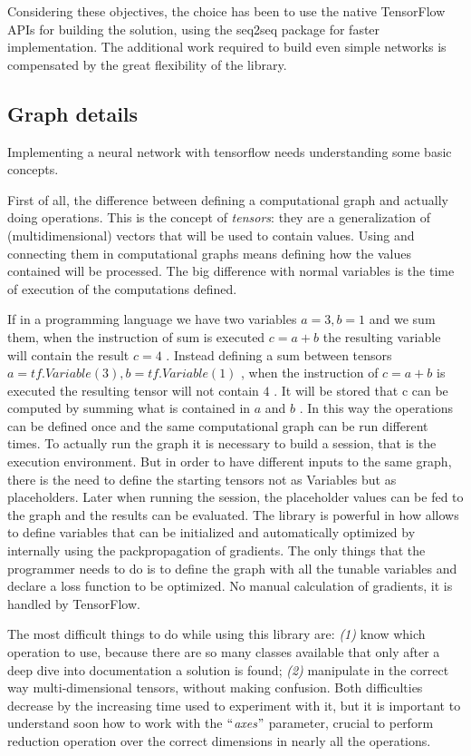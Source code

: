 Considering these objectives, the choice has been to use the native TensorFlow APIs for building the solution, using the seq2seq package for faster implementation. The additional work required to build even simple networks is compensated by the great flexibility of the library.

\subsection{Graph details}
\label{implementationNNDetails}

Implementing a neural network with tensorflow needs understanding some basic concepts.

First of all, the difference between defining a computational graph and actually doing operations. This is the concept of \textit{tensors}: they are a generalization of (multidimensional) vectors that will be used to contain values. Using and connecting them in computational graphs means defining how the values contained will be processed. The big difference with normal variables is the time of execution of the computations defined.

If in a programming language we have two variables  \( a=3,b=1 \)  and we sum them, when the instruction of sum is executed  \( c=a+b \)  the resulting variable will contain the result  \( c=4 \) . Instead defining a sum between tensors  \( a=tf.Variable \left( 3 \right) ,b=tf.Variable \left( 1 \right)  \) , when the instruction of  \( c=a+b \)  is executed the resulting tensor will not contain  \( 4 \) . It will be stored that c can be computed by summing what is contained in  \( a \)  and  \( b \) . In this way the operations can be defined once and the same computational graph can be run different times. To actually run the graph it is necessary to build a session, that is the execution environment. But in order to have different inputs to the same graph, there is the need to define the starting tensors not as Variables but as placeholders. Later when running the session, the placeholder values can be fed to the graph and the results can be evaluated. The library is powerful in how allows to define variables that can be initialized and automatically optimized by internally using the packpropagation of gradients. The only things that the programmer needs to do is to define the graph with all the tunable variables and declare a loss function to be optimized. No manual calculation of gradients, it is handled by TensorFlow.

The most difficult things to do while using this library are: \textit{(1)} know which operation to use, because there are so many classes available that only after a deep dive into documentation a solution is found; \textit{(2)} manipulate in the correct way multi-dimensional tensors, without making confusion. Both difficulties decrease by the increasing time used to experiment with it, but it is important to understand soon how to work with the $``$\textit{axes}$"$  parameter, crucial to perform reduction operation over the correct dimensions in nearly all the operations.

